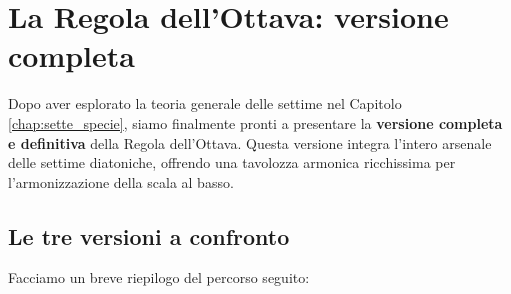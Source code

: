 
\chapter{La Regola dell'Ottava: versione completa}
\label{chap:regola_ottava_completa}

Dopo aver esplorato la teoria generale delle settime nel Capitolo \ref{chap:sette_specie}, siamo finalmente pronti a presentare la \textbf{versione completa e definitiva} della Regola dell'Ottava. Questa versione integra l'intero arsenale delle settime diatoniche, offrendo una tavolozza armonica ricchissima per l'armonizzazione della scala al basso.

\section{Le tre versioni a confronto}
\label{sec:tre_versioni_confronto}

Facciamo un breve riepilogo del percorso seguito:

